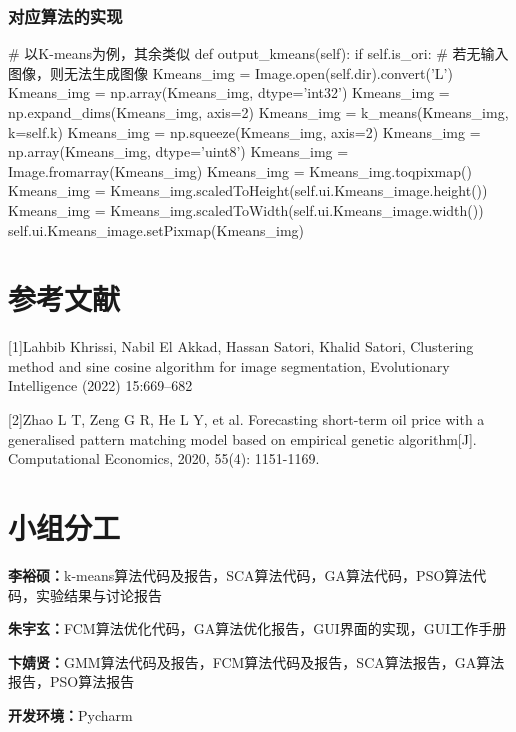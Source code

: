 \documentclass{article}
\begin{document}
\subsubsection{对应算法的实现}
\begin{python}
	# 以K-means为例，其余类似
	def output_kmeans(self):
	if self.is_ori: # 若无输入图像，则无法生成图像
	Kmeans_img = Image.open(self.dir).convert('L')
	Kmeans_img = np.array(Kmeans_img, dtype='int32')
	Kmeans_img = np.expand_dims(Kmeans_img, axis=2)
	Kmeans_img = k_means(Kmeans_img, k=self.k)
	Kmeans_img = np.squeeze(Kmeans_img, axis=2)
	Kmeans_img = np.array(Kmeans_img, dtype='uint8')
	Kmeans_img = Image.fromarray(Kmeans_img)
	Kmeans_img = Kmeans_img.toqpixmap()
	Kmeans_img = Kmeans_img.scaledToHeight(self.ui.Kmeans_image.height())
	Kmeans_img = Kmeans_img.scaledToWidth(self.ui.Kmeans_image.width())
	self.ui.Kmeans_image.setPixmap(Kmeans_img)
\end{python}

\section*{参考文献}
[1]Lahbib Khrissi, Nabil El Akkad, Hassan Satori, 
Khalid Satori, Clustering method and sine cosine algorithm for image segmentation, Evolutionary Intelligence (2022) 15:669–682 

[2]Zhao L T, Zeng G R, He L Y, et al. Forecasting short-term oil price with a generalised pattern matching model based on empirical genetic algorithm[J]. Computational Economics, 2020, 55(4): 1151-1169.

\section*{小组分工}
\textbf{李裕硕：}k-means算法代码及报告，SCA算法代码，GA算法代码，PSO算法代码，实验结果与讨论报告

\textbf{朱宇玄：}FCM算法优化代码，GA算法优化报告，GUI界面的实现，GUI工作手册

\textbf{卞婧贤：}GMM算法代码及报告，FCM算法代码及报告，SCA算法报告，GA算法报告，PSO算法报告

\textbf{开发环境：}Pycharm
\end{document}
